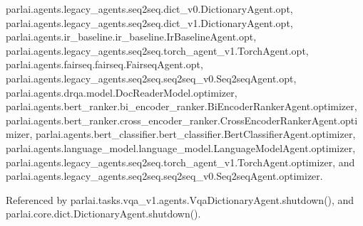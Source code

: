 parlai.\+agents.\+legacy\+\_\+agents.\+seq2seq.\+dict\+\_\+v0.\+Dictionary\+Agent.\+opt, parlai.\+agents.\+legacy\+\_\+agents.\+seq2seq.\+dict\+\_\+v1.\+Dictionary\+Agent.\+opt, parlai.\+agents.\+ir\+\_\+baseline.\+ir\+\_\+baseline.\+Ir\+Baseline\+Agent.\+opt, parlai.\+agents.\+legacy\+\_\+agents.\+seq2seq.\+torch\+\_\+agent\+\_\+v1.\+Torch\+Agent.\+opt, parlai.\+agents.\+fairseq.\+fairseq.\+Fairseq\+Agent.\+opt, parlai.\+agents.\+legacy\+\_\+agents.\+seq2seq.\+seq2seq\+\_\+v0.\+Seq2seq\+Agent.\+opt, parlai.\+agents.\+drqa.\+model.\+Doc\+Reader\+Model.\+optimizer, parlai.\+agents.\+bert\+\_\+ranker.\+bi\+\_\+encoder\+\_\+ranker.\+Bi\+Encoder\+Ranker\+Agent.\+optimizer, parlai.\+agents.\+bert\+\_\+ranker.\+cross\+\_\+encoder\+\_\+ranker.\+Cross\+Encoder\+Ranker\+Agent.\+optimizer, parlai.\+agents.\+bert\+\_\+classifier.\+bert\+\_\+classifier.\+Bert\+Classifier\+Agent.\+optimizer, parlai.\+agents.\+language\+\_\+model.\+language\+\_\+model.\+Language\+Model\+Agent.\+optimizer, parlai.\+agents.\+legacy\+\_\+agents.\+seq2seq.\+torch\+\_\+agent\+\_\+v1.\+Torch\+Agent.\+optimizer, and parlai.\+agents.\+legacy\+\_\+agents.\+seq2seq.\+seq2seq\+\_\+v0.\+Seq2seq\+Agent.\+optimizer.



Referenced by parlai.\+tasks.\+vqa\+\_\+v1.\+agents.\+Vqa\+Dictionary\+Agent.\+shutdown(), and parlai.\+core.\+dict.\+Dictionary\+Agent.\+shutdown().

